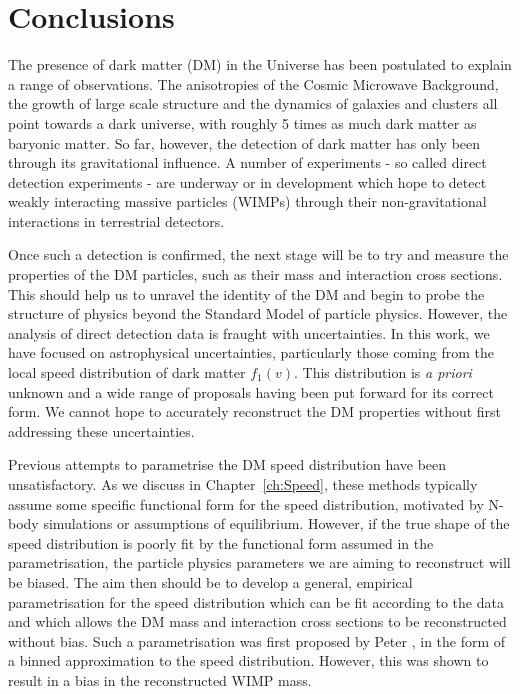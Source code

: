 \chapter{Conclusions}
\label{ch:Conclusions}

The presence of dark matter (DM) in the Universe has been postulated to explain a range of observations. The anisotropies of the Cosmic Microwave Background, the growth of large scale structure and the dynamics of galaxies and clusters all point towards a dark universe, with roughly 5 times as much dark matter as baryonic matter. So far, however, the detection of dark matter has only been through its gravitational influence. A number of experiments - so called direct detection experiments - are underway or in development which hope to detect weakly interacting massive particles (WIMPs) through their non-gravitational interactions in terrestrial detectors.

Once such a detection is confirmed, the next stage will be to try and measure the properties of the DM particles, such as their mass and interaction cross sections. This should help us to unravel the identity of the DM and begin to probe the structure of physics beyond the Standard Model of particle physics. However, the analysis of direct detection data is fraught with uncertainties. In this work, we have focused on astrophysical uncertainties, particularly those coming from the local speed distribution of dark matter $f_1(v)$. This distribution is \textit{a priori} unknown and a wide range of proposals having been put forward for its correct form. We cannot hope to accurately reconstruct the DM properties without first addressing these uncertainties.

Previous attempts to parametrise the DM speed distribution have been unsatisfactory. As we discuss in Chapter~\ref{ch:Speed}, these methods typically assume some specific functional form for the speed distribution, motivated by N-body simulations or assumptions of equilibrium. However, if the true shape of the speed distribution is poorly fit by the functional form assumed in the parametrisation, the particle physics parameters we are aiming to reconstruct will be biased. The aim then should be to develop a general, empirical parametrisation for the speed distribution which can be fit according to the data and which allows the DM mass and interaction cross sections to be reconstructed without bias. Such a parametrisation was first proposed by Peter \cite{Peter:2011}, in the form of a binned approximation to the speed distribution. However, this was shown to result in a bias in the reconstructed WIMP mass.

